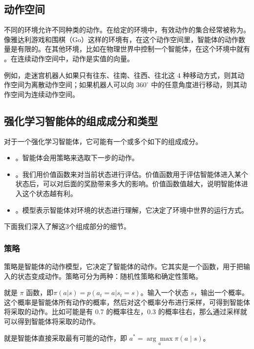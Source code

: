\subsection{动作空间} 

不同的环境允许不同种类的动作。在给定的环境中，有效动作的集合经常被称为。像雅达利游戏和围棋（Go）这样的环境有，在这个动作空间里，智能体的动作数量是有限的。在其他环境，比如在物理世界中控制一个智能体，在这个环境中就有 。在连续动作空间中，动作是实值的向量。 

例如，走迷宫机器人如果只有往东、往南、往西、往北这 4 种移动方式，则其动作空间为离散动作空间；如果机器人可以向 $360^{\circ}$ 中的任意角度进行移动，则其动作空间为连续动作空间。

\subsection{强化学习智能体的组成成分和类型}

对于一个强化学习智能体，它可能有一个或多个如下的组成成分。
\begin{itemize}
    \item {}。智能体会用策略来选取下一步的动作。
    \item {}。我们用价值函数来对当前状态进行评估。价值函数用于评估智能体进入某个状态后，可以对后面的奖励带来多大的影响。价值函数值越大，说明智能体进入这个状态越有利。
    \item {}。模型表示智能体对环境的状态进行理解，它决定了环境中世界的运行方式。
\end{itemize}

下面我们深入了解这3个组成部分的细节。

\subsubsection{策略}
策略是智能体的动作模型，它决定了智能体的动作。它其实是一个函数，用于把输入的状态变成动作。策略可分为两种：随机性策略和确定性策略。

就是 $\pi$ 函数，即$\pi(a | s)=p\left(a_{t}=a | s_{t}=s\right)$。输入一个状态 $s$，输出一个概率。 
这个概率是智能体所有动作的概率，然后对这个概率分布进行采样，可得到智能体将采取的动作。比如可能是有 0.7 的概率往左，0.3 的概率往右，那么通过采样就可以得到智能体将采取的动作。

就是智能体直接采取最有可能的动作，即 $a^{*}=\underset{a}{\arg \max} \pi(a \mid s)$。 


